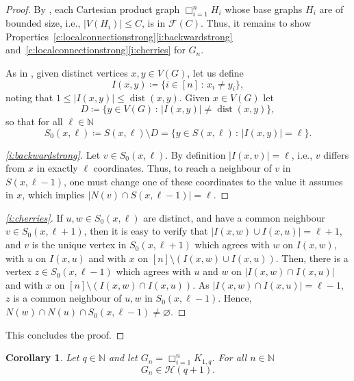 \documentclass[reqno,a4paper,11pt]{amsart}
\newtheorem{corollary}[theorem]{Corollary}
\theoremstyle{definition}
\newcommand{\car}{\mathbin{\Box}}
\newcommand{\dist}{\operatorname{dist}}
\renewcommand{\leq}{\leqslant}
\begin{document}
\begin{proof}
  By \cite[Lemma 8.2]{CEGK24}, each Cartesian product graph $\car_{i=1}^n H_i$ whose base graphs $H_i$ are of bounded size, i.e., $|V(H_i)| \leq C$, is in $\mathcal{F}(C)$.
  Thus, it remains to show Properties~\ref{c:localconnectionstrong}\ref{i:backwardstrong} and~\ref{c:localconnectionstrong}\ref{i:cherries} for $G_n$.

  As in \cite{CEGK24}, given distinct vertices $x,y \in V(G)$, let us define
  \[
    I(x,y) \coloneqq \{ i \in [n] \,:\, x_i \neq y_i\},
  \]
  noting that $1\leq|I(x,y)| \leq \dist(x,y)$.
  Given $x\in V(G)$ let
  \[
    D \coloneqq \{ y \in V(G) \,:\, |I(x,y)| \neq \dist(x,y)\},
  \]
  so that for all $\ell \in \mathbb{N}$
  \[
    S_0(x,\ell) \coloneqq S(x,\ell) \setminus D = \{y \in S(x,\ell) \,:\, |I(x,y)| =\ell\}.
  \]

  \begin{proof}[\ref{i:backwardstrong}]\let\qed\relax
    Let $v \in S_0(x, \ell)$.
    By definition $|I(x, v)|=\ell$, i.e., $v$ differs from $x$ in exactly $\ell$ coordinates.
    Thus, to reach a neighbour of $v$ in $S(x, \ell-1)$, one must change one of these coordinates to the value it assumes in $x$, which implies $|N(v) \cap S(x, \ell-1)|=\ell$.
  \end{proof}

  \begin{proof}[\ref{i:cherries}]\let\qed\relax
    If $u, w \in S_0(x,\ell)$ are distinct, and have a common neighbour $v \in S_0(x,\ell+1)$, then it is easy to verify that $|I(x,w) \cup I(x,u)| = \ell+1$, and $v$ is the unique vertex in $S_0(x,\ell+1)$ which agrees with $w$ on $I(x,w)$, with $u$ on $I(x,u)$ and with $x$ on $[n] \setminus (I(x,w) \cup I(x,u))$.
    Then, there is a vertex $z \in S_0(x, \ell-1)$ which agrees with $u$ and $w$ on $|I(x, w) \cap I(x, u)|$ and with $x$ on $[n] \setminus (I(x, w) \cap I(x, u))$.
    As $|I(x, w) \cap I(x, u)| = \ell-1$, $z$ is a common neighbour of $u,w$ in $S_0(x, \ell-1)$.
    Hence, $N(w) \cap N(u) \cap S_0(x, \ell-1) \neq \varnothing$.
  \end{proof}

  This concludes the proof.
\end{proof}

\begin{corollary}
  Let $q \in \mathbb{N}$ and let $G_n=\car_{i=1}^n K_{1,q}$.
  For all $n \in \mathbb{N}$
  \[
    G_n \in \mathcal{H}(q+1).
  \]
\end{corollary}
\end{document}
